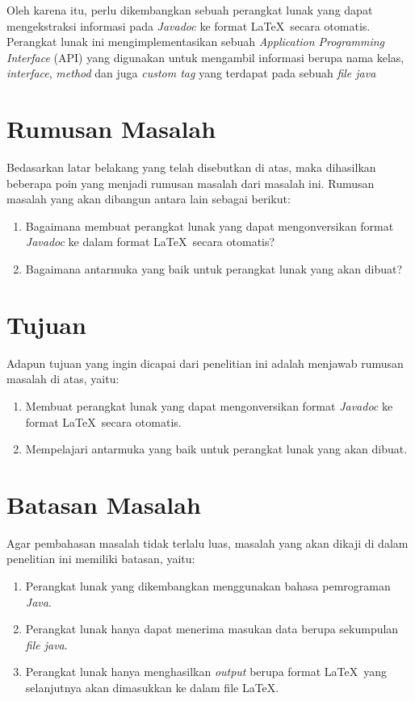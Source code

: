 Oleh karena itu, perlu dikembangkan sebuah perangkat lunak yang dapat mengekstraksi informasi pada {\it Javadoc} ke format \LaTeX\ secara otomatis. Perangkat lunak ini mengimplementasikan sebuah {\it Application Programming Interface} (API) yang digunakan untuk mengambil informasi berupa nama kelas, {\it interface}, {\it method} dan juga {\it custom tag} yang terdapat pada sebuah {\it file java}

\section{Rumusan Masalah}
\label{sec:rumusan}
Bedasarkan latar belakang yang telah disebutkan di atas, maka dihasilkan beberapa poin yang menjadi rumusan masalah dari masalah ini. Rumusan masalah yang akan dibangun antara lain sebagai berikut:
\begin{enumerate}
	\item Bagaimana membuat perangkat lunak yang dapat mengonversikan format {\it Javadoc} ke dalam format \LaTeX\ secara otomatis?
	\item Bagaimana antarmuka yang baik untuk perangkat lunak yang akan dibuat?
\end{enumerate}

\section{Tujuan}
\label{sec:tujuan}
Adapun tujuan yang ingin dicapai dari penelitian ini adalah menjawab rumusan masalah di atas, yaitu:
\begin{enumerate}
	\item Membuat perangkat lunak yang dapat mengonversikan format {\it Javadoc} ke format \LaTeX\ secara otomatis.
	\item Mempelajari antarmuka yang baik untuk perangkat lunak yang akan dibuat.
\end{enumerate}

\section{Batasan Masalah}
\label{sec:batasan}
Agar pembahasan masalah tidak terlalu luas, masalah yang akan dikaji di dalam penelitian ini memiliki batasan, yaitu:
\begin{enumerate}
	\item Perangkat lunak yang dikembangkan menggunakan bahasa pemrograman {\it Java}.
	\item Perangkat lunak hanya dapat menerima masukan data berupa sekumpulan {\it file java}.
	\item Perangkat lunak hanya menghasilkan {\it output } berupa format \LaTeX\ yang selanjutnya akan dimasukkan ke dalam file \LaTeX.
\end{enumerate}

